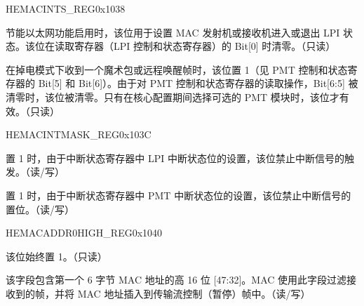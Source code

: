 \begin{register}{H}{EMACINTS\_REG}{0x1038}\label{regdesc:EMACINTSREG}
%
%
%
%
%
%
\regnewline%
\begin{regdesc}\begin{reglist}
\item [LPIINTS] 节能以太网功能启用时，该位用于设置 MAC 发射机或接收机进入或退出 LPI 状态。该位在读取寄存器（LPI 控制和状态寄存器）的 Bit[0] 时清零。（只读）

\item [PMTINTS] 在掉电模式下收到一个魔术包或远程唤醒帧时，该位置 1（见 PMT 控制和状态寄存器的 Bit[5] 和 Bit[6]）。由于对 PMT 控制和状态寄存器的读取操作，Bit[6:5] 被清零时，该位被清零。只有在核心配置期间选择可选的 PMT 模块时，该位才有效。（只读）
\end{reglist}\end{regdesc}
\end{register}


\begin{register}{H}{EMACINTMASK\_REG}{0x103C}\label{regdesc:EMACINTMASKREG}
%
%
%
%
%
%
\regnewline%
\begin{regdesc}\begin{reglist}
\item [LPIINTMASK]置 1 时，由于中断状态寄存器中 LPI 中断状态位的设置，该位禁止中断信号的触发。（读/写）
\item [PMTINTMASK]置 1 时，由于中断状态寄存器中 PMT 中断状态位的设置，该位禁止中断信号的置位。（读/写）
\end{reglist}\end{regdesc}
\end{register}


\begin{register}{H}{EMACADDR0HIGH\_REG}{0x1040}\label{regdesc:EMACADDR0HIGHREG}
%
%
%
\regnewline%
\begin{regdesc}\begin{reglist}
\item [ADDRESS\_ENABLE0] 该位始终置 1。（只读）
\item [MAC\_ADDRESS0\_HI] 该字段包含第一个 6 字节 MAC 地址的高 16 位 [47:32]。MAC 使用此字段过滤接收到的帧，并将 MAC 地址插入到传输流控制（暂停）帧中。（读/写）
\end{reglist}\end{regdesc}
\end{register}


